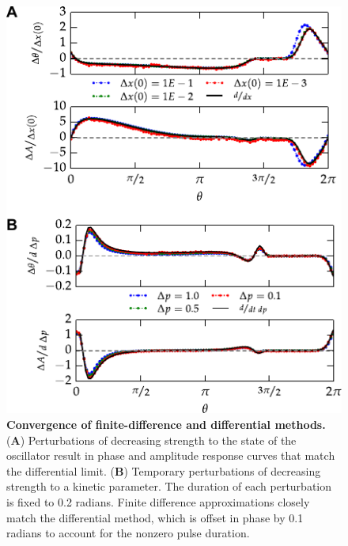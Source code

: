 \documentclass[11pt, letterpaper]{article}
\begin{document}
\begin{figure}[h!]
  \begin{center}
    \includegraphics[width=.75\textwidth]{figures/figure_S1.pdf}
    \caption{{\bfseries Convergence of finite-difference and differential
    methods.} ({\bfseries A}) Perturbations of decreasing strength to the state
    of the oscillator result in phase and amplitude response curves that match
    the differential limit. ({\bfseries B}) Temporary perturbations of
    decreasing strength to a kinetic parameter. The duration of each
    perturbation is fixed to 0.2 radians. Finite difference approximations
    closely match the differential method, which is offset in phase by 0.1
    radians to account for the nonzero pulse duration.}
\end{center}
\end{figure}
\end{document}
